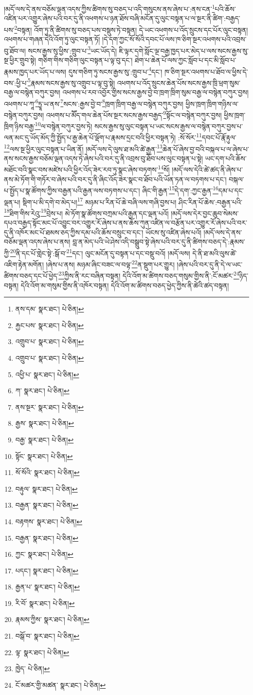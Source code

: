 །མདོ་ལས་དེ་ནས་བཅོམ་ལྡན་འདས་ཀྱིས་ཚིགས་སུ་བཅད་པ་འདི་གསུངས་ནས་ཞེས་པ་:ནས་ངན་\footnote{ནས་དམ་  སྣར་ཐང་།  པེ་ཅིན། }པའི་ཆོས་འཛིན་པར་འགྱུར་ཞེས་པའི་བར་དུ་ནི་འཕགས་པ་ཉན་ཐོས་བཞི་མངོན་དུ་ལུང་བསྟན་པ་ལ་སྔར་ནི་ཚིག་:བརྒྱད་པས་\footnote{རྐྱང་པས་  སྣར་ཐང་།  པེ་ཅིན། }བསྟན། འོག་ཏུ་ནི་ཚིགས་སུ་བཅད་པས་བསྡུས་ཏེ་བསྟན། དེ་ཡང་འཕགས་པ་འོད་སྲུངས་དང་པོར་ལུང་བསྟན། འཕགས་པ་གཞན་དེའི་འོག་ཏུ་ལུང་བསྟན་ཏོ། །དེ་དག་ཀྱང་སོ་སོའི་དབང་པོ་ལས་ཁ་ཅིག་སྔར་འཕགས་པའི་འབྲས་བུ་ཐོབ་ལ། སངས་རྒྱས་སུ་ཕྱིས་:གྲུབ་པ་\footnote{འགྲུབ་པ་  སྣར་ཐང་།  པེ་ཅིན། }ཡང་ཡོད་དེ། ཇི་ལྟར་དགེ་སློང་ལྔ་བརྒྱ་ཁྱད་པར་མེད་པ་ལས་སངས་རྒྱས་སུ་སྔ་ཕྱིར་གྲུབ་སྟེ། གཅིག་གིས་གཅིག་ལུང་བསྟན་པ་ལྟ་བུ་དང་། ཐེག་པ་ཆེན་པོ་ལས་ཀྱང་སློབ་པ་དང་མི་སློབ་པ་རྣམས་ཁྱད་པར་ཡོད་པ་ལས། དུས་གཅིག་ཏུ་སངས་རྒྱས་སུ་:གྲུབ་པ་\footnote{འགྲུབ་པ་  སྣར་ཐང་།  པེ་ཅིན། }དང་། ཁ་ཅིག་སྔར་འཕགས་པ་ཐོབ་ལ་ཕྱིས་དེ་བས་:ཕྱི་པ་\footnote{འཕྱི་པ་  སྣར་ཐང་།  པེ་ཅིན། }རྣམས་སངས་རྒྱས་སུ་འགྲུབ་པ་ལྟ་བུ་སྟེ། འཕགས་པ་འོད་སྲུངས་ཆེན་པོས་སངས་རྒྱས་ཁྲི་ཕྲག་སུམ་བརྒྱ་ལ་བསྙེན་བཀུར་བྱས། འཕགས་པ་རབ་འབྱོར་གྱིས་སངས་རྒྱས་བྱེ་བ་ཁྲག་ཁྲིག་སུམ་བརྒྱ་ལ་བསྙེན་བཀུར་བྱས། འཕགས་པ་ཀཱ་\footnote{ཀ་  སྣར་ཐང་།  པེ་ཅིན། }ཏྱཱ་ཡ་ནས་\footnote{ནས་སྔར་  སྣར་ཐང་།  པེ་ཅིན། }སངས་:རྒྱས་བྱེ་བ་\footnote{རྒྱས་  སྣར་ཐང་།  པེ་ཅིན། }ཁྲག་ཁྲིག་བརྒྱ་ལ་བསྙེན་བཀུར་བྱས། ཕྱིས་ཁྲག་ཁྲིག་གཉིས་ལ་བསྙེན་བཀུར་བྱས། འཕགས་པ་མཽད་གལ་ཆེན་པོས་སྔར་སངས་རྒྱས་བརྒྱད་\footnote{བརྒྱ་  སྣར་ཐང་།  པེ་ཅིན། }སྟོང་ལ་བསྙེན་བཀུར་བྱས། ཕྱིས་ཁྲག་ཁྲིག་ཉིས་བརྒྱ་\footnote{སྟོང་  སྣར་ཐང་།  པེ་ཅིན། }ལ་བསྙེན་བཀུར་བྱས་ཏེ། སངས་རྒྱས་སུ་ལུང་བསྟན་པ་ཡང་སངས་རྒྱས་ལ་བསྙེན་བཀུར་བྱས་པ་ལན་མང་དུ་ཡོད་མོད་ཀྱི་སྤྱོད་པ་རྒྱ་ཆེན་པོ་ལྡོག་པ་རྣམས་དྲང་བའི་ཕྱིར་བསྟན་ཏེ། :སོ་སོར་\footnote{སོ་སོའི་  སྣར་ཐང་།  པེ་ཅིན། }དབང་པོ་རྣོ་རྟུལ་\footnote{བརྟུལ་  སྣར་ཐང་།  པེ་ཅིན། }ལས་སྔ་ཕྱིར་ལུང་བསྟན་པ་ཡིན་ནོ། །མདོ་ལས་དེ་ལུས་ཐ་མའི་ཚེ་རྒྱན་\footnote{བརྒྱན་  སྣར་ཐང་།  པེ་ཅིན། }ཆེན་པོ་ཞེས་བྱ་བའི་བསྐལ་པ་ལ་ཞེས་པ་ནས་སངས་རྒྱས་བཅོམ་ལྡན་འདས་ཏེ་ཞེས་པའི་བར་དུ་ནི་འབྲས་བུ་ཐོབ་པས་ལུང་བསྟན་པ་སྟེ། ཡང་དག་པའི་ཆོས་མཐོང་བའི་སྣང་བས་མཛེས་པའི་ཕྱིར་འོད་ཟེར་རབ་ཏུ་སྣང་ཞེས་བཏགས་\footnote{བརྟགས་  སྣར་ཐང་།  པེ་ཅིན། }སོ། །མདོ་ལས་དེའི་ཚེ་ཚད་ནི་ཞེས་པ་ནས་མེ་ཏོག་གི་གཏོར་བ་ཞེས་པའི་བར་དུ་ནི་ཞིང་འོད་ཟེར་སྣང་བ་ཐོབ་པའི་ཡོན་ཏན་ལ་བཏགས་པ་དང་། བསྐལ་པ་སྤྱོད་པ་སྣ་ཚོགས་ཀྱིས་བརྒྱན་པའི་རྒྱན་ལས་བཏགས་པ་དང་། ཞིང་གི་རྒྱན་\footnote{བརྒྱན་  སྣར་ཐང་།  པེ་ཅིན། }དེ་དག་:ཀྱང་རྒྱན་\footnote{ཀྱང་  སྣར་ཐང་།  པེ་ཅིན། }དམ་པ་དང་ལྡན་པ། སྡིག་པ་མི་དགེ་བ་མེད་པ།\footnote{པདང་།  སྣར་ཐང་།  པེ་ཅིན། } མཉམ་པ་རིན་པོ་ཆེ་བཞི་ལས་གཞི་བྱས་པ། ཤིང་རིན་པོ་ཆེས་:བརྒྱན་པའི་\footnote{རྒྱན་པ་  སྣར་ཐང་།  པེ་ཅིན། }ཐིག་གིས་རེའུ་\footnote{རི་བོ་  སྣར་ཐང་།  པེ་ཅིན། }བྲེས་པ། མེ་ཏོག་སྣ་ཚོགས་བཀྲམ་པའི་རྒྱན་དང་ལྡན་པའོ། །མདོ་ལས་དེར་བྱང་ཆུབ་སེམས་དཔའ་བརྒྱད་སྟོང་མང་པོ་འབྱུང་བར་འགྱུར་རོ་ཞེས་པ་ནས་ཆོས་ཀུན་འཛིན་ལ་བརྩོན་པར་འགྱུར་རོ་ཞེས་པའི་བར་དུ་ནི་འཁོར་མང་པོ་ཐམས་ཅད་ཀྱིས་དམ་པའི་ཆོས་བསྲུང་བ་དང་། ཡོངས་སུ་འཛིན་ཞེས་པའོ། །མདོ་ལས་དེ་ནས་བཅོམ་ལྡན་འདས་ཞེས་པ་ནས། བླ་ན་མེད་པའི་ཡེ་ཤེས་འདི་བསྒྲུབ་སྟེ་ཞེས་པའི་བར་དུ་ནི་ཚིགས་བཅད་དེ་:རྣམས་ཀྱི་\footnote{རྣམས་ཀྱིས་  སྣར་ཐང་།  པེ་ཅིན། }ནི་དང་པོ་གླེང་སྟེ་:སྒོ་བ་\footnote{བསྒོ་བ་  སྣར་ཐང་།  པེ་ཅིན། }དང་། ལུང་མངོན་དུ་བསྟན་པ་དང་བསྡུ་བའོ། །མདོ་ལས། དེ་ནི་ཐ་མའི་ལུས་ཚེ་འཇིག་རྟེན་མགོན། །ཞེས་པ་ནས། མཉམ་ཞིང་བཟང་ལ་བལྟ་\footnote{ལྟ་  སྣར་ཐང་།  པེ་ཅིན། }ན་སྡུག་པར་གྱུར། །ཞེས་པའི་བར་དུ་ནི་དེ་ལ་ཡང་ཚིགས་བཅད་དང་པོ་ཕྱེད་\footnote{ཁྱེད་  པེ་ཅིན། }ཀྱིས་ནི་རང་བཞིན་བསྟན། དེའི་འོག་མ་ཚིགས་བཅད་གསུམ་གྱིས་ནི་:ངོ་མཚར་\footnote{ངོ་མཚར་གྱི་མཚན་  སྣར་ཐང་།  པེ་ཅིན། }ཉིད་བསྟན། དེའི་འོག་མ་གསུམ་གྱིས་ནི་འཁོར་བསྟན། དེའི་འོག་མ་ཚིགས་བཅད་ཕྱེད་ཀྱིས་ནི་ཚེའི་ཚད་བསྟན། 